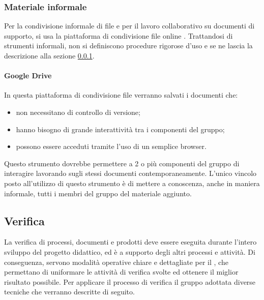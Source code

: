 \documentclass[12pt,a4paper]{article}
\begin{document}
\subsubsection{Materiale informale}\label{sec:matinf}
Per la condivisione informale di file e per il lavoro collaborativo su documenti di supporto, si usa la piattaforma di condivisione file online . Trattandosi di strumenti informali, non si definiscono procedure rigorose d’uso e se ne lascia la descrizione alla sezione \ref{sec:matinf}.

\paragraph{Google Drive}
In questa piattaforma di condivisione file verranno salvati i documenti che:
\begin{itemize}
	\item non necessitano di controllo di versione;
	\item hanno bisogno di grande interattività tra i componenti del gruppo;
	\item possono essere acceduti tramite l’uso di un semplice browser.
\end{itemize}

Questo strumento dovrebbe permettere a 2 o più componenti del gruppo di interagire lavorando sugli stessi documenti contemporaneamente.
L'unico vincolo posto all'utilizzo di questo strumento è di mettere a conoscenza, anche in maniera informale, tutti i membri del gruppo del materiale aggiunto.


\subsection{Verifica}
La verifica di processi, documenti e prodotti deve essere eseguita durante l'intero sviluppo del progetto didattico, ed è a supporto degli altri processi e attività. Di conseguenza, servono modalità operative chiare e dettagliate per il \VR, che permettano di uniformare le attività di verifica svolte ed ottenere il miglior risultato possibile. Per applicare il processo di verifica il gruppo adottata diverse tecniche che verranno descritte di seguito.
\end{document}
